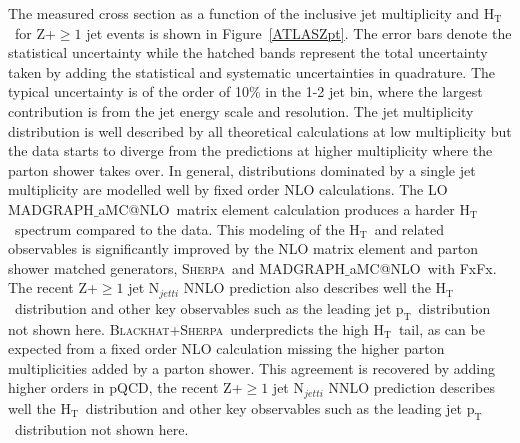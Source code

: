 \documentclass[a4paper,11pt,notoc]{article}
\makeatletter
\newcommand{\pt}{\ensuremath{\mathrm{p_T}}}
\newcommand{\Ht}{\ensuremath{\mathrm{H_T}}}
\newcommand{\SHERPA}{\textsc{Sherpa}}
\newcommand{\BLACKHAT}{\textsc{Blackhat}}
\newcommand{\MGNLO}{MADGRAPH$\_$aMC@NLO}
\makeatother
\begin{document}
The measured cross section as a function of the inclusive jet multiplicity and \Ht\ for Z+$\ge 1$ jet events is shown in Figure~\ref{ATLASZpt}.
The error bars denote the statistical uncertainty while the hatched bands represent the total uncertainty taken by adding the statistical and systematic uncertainties in quadrature. The typical uncertainty is of the order of 10\% in the 1-2 jet bin, where the largest contribution is from the jet energy scale and resolution. 
The jet multiplicity distribution is well described by all theoretical calculations at low multiplicity but the data starts to diverge from the predictions at higher multiplicity where the parton shower takes over. 
In general, distributions dominated by a single jet multiplicity are modelled well by fixed order NLO calculations. The LO \MGNLO\ matrix element calculation produces a harder \Ht\ spectrum compared to the data. This modeling of the \Ht\ and related observables is significantly improved by the NLO matrix element and parton shower matched generators, \SHERPA\ and \MGNLO\ with FxFx. The recent Z+$\ge 1$ jet N$_{jetti}$ NNLO prediction also describes well the \Ht\ distribution and other key observables such as the leading jet \pt\ distribution not shown here. \BLACKHAT+\SHERPA\ underpredicts the high \Ht\ tail, as can be expected from a fixed order NLO calculation missing the higher parton multiplicities added by a parton shower. This agreement is recovered by adding higher orders in pQCD, the recent Z+$\ge 1$ jet N$_{jetti}$ NNLO prediction describes well the \Ht\ distribution and other key observables such as the leading jet \pt\ distribution not shown here.

\end{document}
